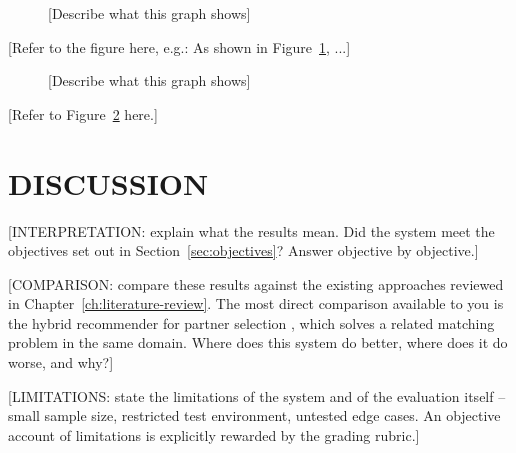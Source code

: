 \begin{figure}[H]
  \centering
  \caption{[Describe what this graph shows]}
  \label{fig:results-graph-1}
\end{figure}

[Refer to the figure here, e.g.: As shown in
Figure~\ref{fig:results-graph-1}, ...]

\begin{figure}[H]
  \centering
  \caption{[Describe what this graph shows]}
  \label{fig:results-graph-2}
\end{figure}

[Refer to Figure~\ref{fig:results-graph-2} here.]

\section{DISCUSSION}
\label{sec:discussion}

[INTERPRETATION: explain what the results mean. Did the system meet the
objectives set out in Section~\ref{sec:objectives}? Answer objective by
objective.]

[COMPARISON: compare these results against the existing approaches
reviewed in Chapter~\ref{ch:literature-review}. The most direct
comparison available to you is the hybrid recommender for partner
selection \cite{zhang2021hybrid}, which solves a related matching
problem in the same domain. Where does this system do better, where
does it do worse, and why?]

[LIMITATIONS: state the limitations of the system and of the evaluation
itself -- small sample size, restricted test environment, untested edge
cases. An objective account of limitations is explicitly rewarded by
the grading rubric.]
